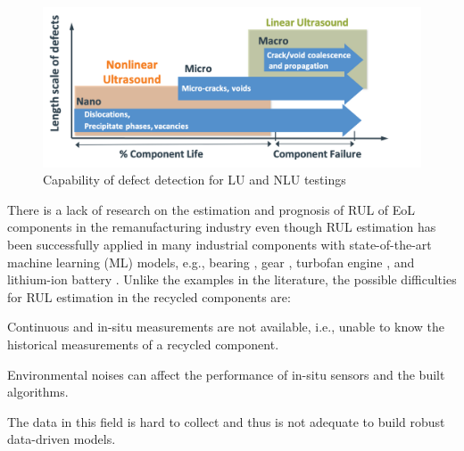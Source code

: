 \begin{figure}[tb]
    \includegraphics[width=\linewidth]{fig/lu_nlu_length_scales.png}
    \caption{Capability of defect detection for LU and NLU testings}
    \label{fig: lu nlu length scales}
\end{figure}

There is a lack of research on the estimation and prognosis of RUL of EoL components in the remanufacturing industry even though RUL estimation has been successfully applied in many industrial components with state-of-the-art machine learning (ML) models, e.g., bearing \cite{rul-nn-bearing-BENALI2015150, rul-cnn-bearing-LI20181, rul-ensemble-bearing}, gear \cite{rul-review-gear}, turbofan engine \cite{rul-statespace-turbo-battery-Mosallam2016,rul-cnn-turbo-LI20181,rul-rnn-turbo-WU2020241}, and lithium-ion battery \cite{rul-statespace-turbo-battery-Mosallam2016,rul-review-battery-LIPU2018115,rul-gpr-battery-9040661}. Unlike the examples in the literature, the possible difficulties for RUL estimation in the recycled components are: 
\begin{enumerate*}[label=\itshape\alph*\upshape)]
    \item Continuous and in-situ measurements are not available, i.e., unable to know the historical measurements of a recycled component.
    \item Environmental noises can affect the performance of in-situ sensors and the built algorithms.
    \item The data in this field is hard to collect and thus is not adequate to build robust data-driven models.
\end{enumerate*}

